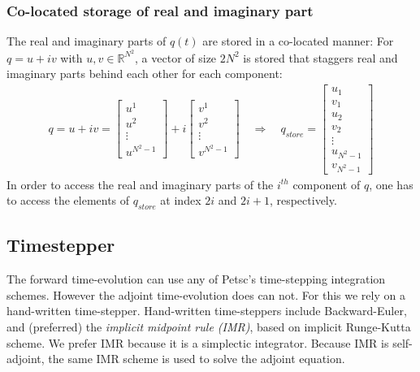 \documentclass[letterpaper]{article}
\newcommand{\R}{\mathds{R}}
\begin{document}
  \subsubsection{Co-located storage of real and imaginary part}
  The real and imaginary parts of $q(t)$ are stored in a co-located manner: For $q = u+iv$ with $u,v\in\R^{N^2}$, a vector of size $2N^2$ is stored that staggers real and imaginary parts behind each other for each component:
  \begin{align*}
    q = u+iv = \begin{bmatrix}
     u^1\\u^2\\ \vdots \\ u^{N^2-1} 
    \end{bmatrix}
    + i \begin{bmatrix}
     v^1\\v^2\\ \vdots \\ v^{N^2-1} 
    \end{bmatrix}
    \quad \Rightarrow \quad
    q_{store} = \begin{bmatrix}
      u_1 \\ v_1\\ u_2 \\ v_2 \\ \vdots \\ u_{N^2-1} \\ v_{N^2-1}
    \end{bmatrix}
  \end{align*}
  In order to access the real and imaginary parts of the $i^{th}$ component of $q$, one has to access the elements of $q_{store}$ at index $2i$ and $2i+1$, respectively. 

  \subsection{Timestepper}
    The forward time-evolution can use any of Petsc's time-stepping integration schemes. However the adjoint time-evolution does can not. For this we rely on a hand-written time-stepper. Hand-written time-steppers include Backward-Euler, and (preferred) the \textit{implicit midpoint rule (IMR)}, based on implicit Runge-Kutta scheme. We prefer IMR because it is a simplectic integrator. Because IMR is self-adjoint, the same IMR scheme is used to solve the adjoint equation. 
\end{document}
